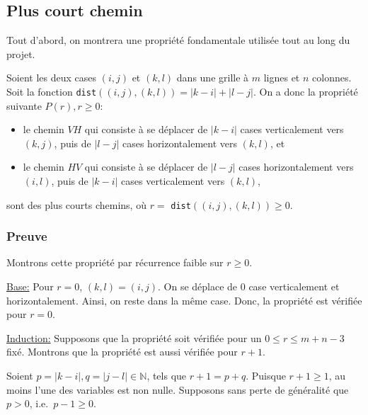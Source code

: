 \documentclass[12pt,a4paper]{article}
\begin{document}
\subsection*{Plus court chemin}
Tout d'abord, on montrera une propri\'et\'e fondamentale utilis\'ee 
tout au long du projet. 

\bigskip
Soient les deux cases $(i,j)$ et $(k,l)$ dans une grille \`a $m$ 
lignes et $n$ colonnes. 
Soit la fonction \texttt{dist}$((i,j),(k,l))=|k-i|+|l-j|$. 
On a donc la propri\'et\'e suivante $P(r), r \geq 0$:
\begin{itemize}
  \item le chemin $VH$ qui consiste \`a se d\'eplacer de $|k-i|$ cases 
  verticalement vers $(k,j)$, puis de $|l-j|$ cases horizontalement vers 
  $(k,l)$, 
  et
  \item le chemin $HV$ qui consiste \`a se d\'eplacer de $|l-j|$ cases 
  horizontalement vers $(i,l)$, puis de $|k-i|$ cases verticalement vers 
  $(k,l)$,
\end{itemize}
sont des plus courts chemins, o\`u $r=$ \texttt{dist}$((i,j),(k,l)) \geq 0$.

\subsubsection*{Preuve}
Montrons cette propri\'et\'e par r\'ecurrence faible sur $r \geq 0$.

\bigskip
\underline{Base:} Pour $r=0$, $(k,l)=(i,j)$. On se d\'eplace de $0$ 
case verticalement et horizontalement. Ainsi, on reste dans la m\^eme case. 
Donc, la propri\'et\'e est v\'erifi\'ee pour $r=0$.

\medskip
\underline{Induction:} Supposons que la propri\'et\'e soit v\'erifi\'ee pour un 
$0 \leq r \leq m+n-3$ fix\'e.
Montrons que la propri\'et\'e est aussi v\'erifi\'ee pour $r+1$.

Soient $p=|k-i|, q=|j-l| \in \mathbb{N}$, tels que $r+1=p+q$. Puisque 
$r+1 \geq1$, au moins l'une des variables est non nulle. Supposons sans perte 
de g\'en\'eralit\'e que $p > 0$, i.e.\ $p-1 \geq 0$.
\end{document}
